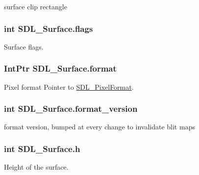 surface clip rectangle 

\hypertarget{struct_s_d_l___surface_a9b902c7b843cd1cc115de47efd82979b}{
\subsubsection[{flags}]{\setlength{\rightskip}{0pt plus 5cm}int {\bf SDL\_\-Surface.flags}}}
\label{struct_s_d_l___surface_a9b902c7b843cd1cc115de47efd82979b}


Surface flags. 

\hypertarget{struct_s_d_l___surface_ad70ef89eb3879b7310311b3da48aa393}{
\subsubsection[{format}]{\setlength{\rightskip}{0pt plus 5cm}IntPtr {\bf SDL\_\-Surface.format}}}
\label{struct_s_d_l___surface_ad70ef89eb3879b7310311b3da48aa393}


Pixel format Pointer to \hyperlink{struct_s_d_l___pixel_format}{SDL\_\-PixelFormat}. 

\hypertarget{struct_s_d_l___surface_a6df25efce6b1921af43cd50e99261a14}{
\subsubsection[{format\_\-version}]{\setlength{\rightskip}{0pt plus 5cm}int {\bf SDL\_\-Surface.format\_\-version}}}
\label{struct_s_d_l___surface_a6df25efce6b1921af43cd50e99261a14}


format version, bumped at every change to invalidate blit maps 

\hypertarget{struct_s_d_l___surface_a4c41b17fe185ae45b0a2ffba5d09c1d8}{
\subsubsection[{h}]{\setlength{\rightskip}{0pt plus 5cm}int {\bf SDL\_\-Surface.h}}}
\label{struct_s_d_l___surface_a4c41b17fe185ae45b0a2ffba5d09c1d8}


Height of the surface. 

